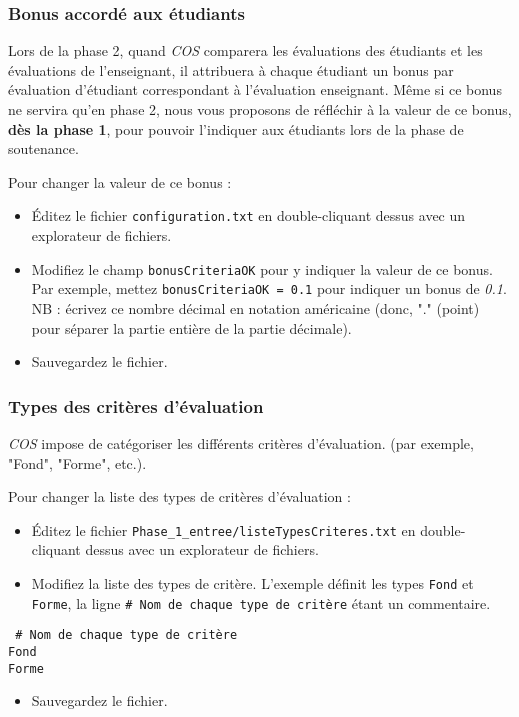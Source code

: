 \documentclass[11pt]{article}
\begin{document}
\subsubsection{Bonus accordé aux étudiants}
\label{sec-4-1-1}
Lors de la phase 2, quand \emph{COS} comparera les évaluations des
étudiants et les évaluations de l'enseignant, il attribuera à chaque
étudiant un bonus par évaluation d'étudiant correspondant à
l'évaluation enseignant. Même si ce bonus ne servira qu'en phase 2,
nous vous proposons de réfléchir à la valeur de ce bonus, \textbf{dès la
phase 1}, pour pouvoir l'indiquer aux étudiants lors de la phase de
soutenance.

Pour changer la valeur de ce bonus :
\begin{itemize}
\item Éditez le fichier \verb~configuration.txt~ en double-cliquant dessus
avec un explorateur de fichiers.
\item Modifiez le champ \verb~bonusCriteriaOK~ pour y indiquer la valeur de ce
bonus. Par exemple, mettez \verb~bonusCriteriaOK = 0.1~ pour indiquer un
bonus de \emph{0.1}. NB : écrivez ce nombre décimal en notation
américaine (donc, "." (point) pour séparer la partie entière de la
partie décimale).
\item Sauvegardez le fichier.
\end{itemize}
\subsubsection{Types des critères d'évaluation}
\label{sec-4-1-2}
\emph{COS} impose de catégoriser les différents critères d'évaluation. (par
exemple, "Fond", "Forme", etc.).

Pour changer la liste des types de critères d'évaluation :
\begin{itemize}
\item Éditez le fichier \verb~Phase_1_entree/listeTypesCriteres.txt~ en
double-cliquant dessus avec un explorateur de fichiers.
\item Modifiez la liste des types de critère. L'exemple définit les types
\verb~Fond~ et \verb~Forme~, la ligne \verb~# Nom de chaque type de critère~ étant
un commentaire.
\end{itemize}
\begin{verbatim}
 # Nom de chaque type de critère
Fond
Forme
\end{verbatim}
\begin{itemize}
\item Sauvegardez le fichier.
\end{itemize}
\end{document}
